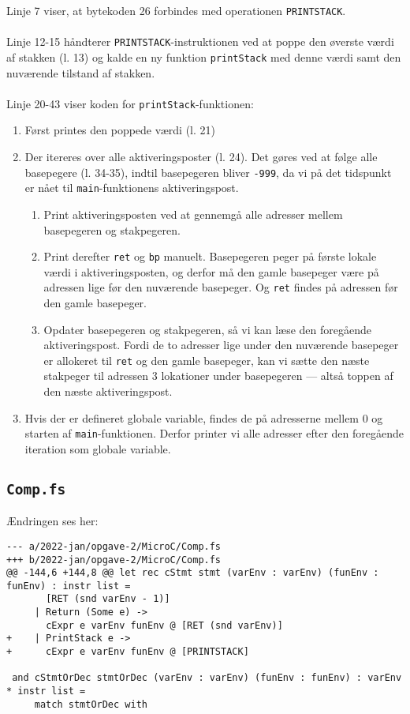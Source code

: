 Linje 7 viser, at bytekoden 26 forbindes med operationen \texttt{PRINTSTACK}.
\\\\
Linje 12-15 håndterer \texttt{PRINTSTACK}-instruktionen ved at poppe den øverste værdi af stakken (l. 13) og kalde en ny funktion \texttt{printStack} med denne værdi samt den nuværende tilstand af stakken.
\\\\
Linje 20-43 viser koden for \texttt{printStack}-funktionen:
\begin{enumerate}
    \item Først printes den poppede værdi (l. 21)
    \item Der itereres over alle aktiveringsposter (l. 24). Det gøres ved at følge alle basepegere (l. 34-35), indtil basepegeren bliver \texttt{-999}, da vi på det tidspunkt er nået til \texttt{main}-funktionens aktiveringspost.
    \begin{enumerate}
        \item Print aktiveringsposten ved at gennemgå alle adresser mellem basepegeren og stakpegeren.
        \item Print derefter \texttt{ret} og \texttt{bp} manuelt. Basepegeren peger på første lokale værdi i aktiveringsposten, og derfor må den gamle basepeger være på adressen lige før den nuværende basepeger. Og \texttt{ret} findes på adressen før den gamle basepeger.
        \item Opdater basepegeren og stakpegeren, så vi kan læse den foregående aktiveringspost. Fordi de to adresser lige under den nuværende basepeger er allokeret til \texttt{ret} og den gamle basepeger, kan vi sætte den næste stakpeger til adressen 3 lokationer under basepegeren --- altså toppen af den næste aktiveringspost.
    \end{enumerate}
    \item Hvis der er defineret globale variable, findes de på adresserne mellem 0 og starten af \texttt{main}-funktionen. Derfor printer vi alle adresser efter den foregående iteration som globale variable.
\end{enumerate}

\subsection{\texttt{Comp.fs}}

Ændringen ses her:

\begin{verbatim}
--- a/2022-jan/opgave-2/MicroC/Comp.fs
+++ b/2022-jan/opgave-2/MicroC/Comp.fs
@@ -144,6 +144,8 @@ let rec cStmt stmt (varEnv : varEnv) (funEnv : funEnv) : instr list =
       [RET (snd varEnv - 1)]
     | Return (Some e) -> 
       cExpr e varEnv funEnv @ [RET (snd varEnv)]
+    | PrintStack e ->
+      cExpr e varEnv funEnv @ [PRINTSTACK]
 
 and cStmtOrDec stmtOrDec (varEnv : varEnv) (funEnv : funEnv) : varEnv * instr list = 
     match stmtOrDec with 
\end{verbatim}

